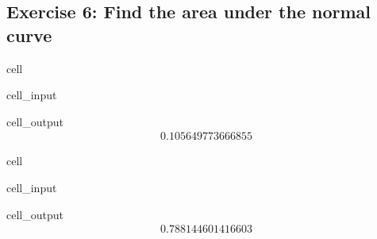 \documentclass[letterpaper,10pt,english]{jupyterBook}
\begin{document}
\subsection{Exercise 6: Find the area under the normal curve}
\label{\detokenize{exercises_unit_3:exercise-6-find-the-area-under-the-normal-curve}}
\begin{sphinxuseclass}{cell}\begin{sphinxVerbatimInput}

\begin{sphinxuseclass}{cell_input}
\begin{sphinxVerbatim}[commandchars=\\\{\}]
\end{sphinxVerbatim}

\end{sphinxuseclass}\end{sphinxVerbatimInput}
\begin{sphinxVerbatimOutput}

\begin{sphinxuseclass}{cell_output}\begin{equation*}
\begin{split}0.105649773666855\end{split}
\end{equation*}
\end{sphinxuseclass}\end{sphinxVerbatimOutput}

\end{sphinxuseclass}
\begin{sphinxuseclass}{cell}\begin{sphinxVerbatimInput}

\begin{sphinxuseclass}{cell_input}
\begin{sphinxVerbatim}[commandchars=\\\{\}]
\end{sphinxVerbatim}

\end{sphinxuseclass}\end{sphinxVerbatimInput}
\begin{sphinxVerbatimOutput}

\begin{sphinxuseclass}{cell_output}\begin{equation*}
\begin{split}0.788144601416603\end{split}
\end{equation*}
\end{sphinxuseclass}\end{sphinxVerbatimOutput}

\end{sphinxuseclass}
\end{document}
